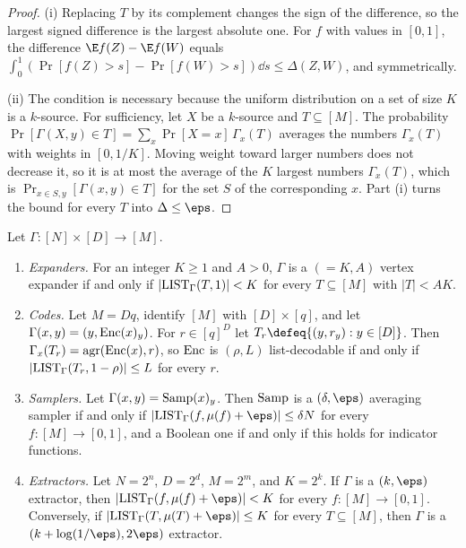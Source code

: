 \begin{refsection}
\begin{proof}
(i) Replacing $T$ by its complement changes the sign of the difference, so the largest signed difference is the largest absolute one. For $f$ with values in $[0,1]$, the difference $\E f(Z)-\E f(W)$ equals $\int_0^1(\Pr[f(Z)>s]-\Pr[f(W)>s])\dd s\le\Delta(Z,W)$, and symmetrically.

(ii) The condition is necessary because the uniform distribution on a set of size $K$ is a $k$-source. For sufficiency, let $X$ be a $k$-source and $T\subseteq[M]$. The probability $\Pr[\Gamma(X,y)\in T]=\sum_x\Pr[X=x]\,\Gamma_x(T)$ averages the numbers $\Gamma_x(T)$ with weights in $[0,1/K]$. Moving weight toward larger numbers does not decrease it, so it is at most the average of the $K$ largest numbers $\Gamma_x(T)$, which is $\Pr_{x\in S,y}[\Gamma(x,y)\in T]$ for the set $S$ of the corresponding $x$. Part (i) turns the bound for every $T$ into $\Delta\le\eps$.
\end{proof}

\begin{proposition}\label{prop:pseudorandom:dictionary}
Let $\Gamma\colon[N]\times[D]\to[M]$.
\begin{enumerate}
\item \emph{Expanders.} For an integer $K\ge1$ and $A>0$, $\Gamma$ is a $({=}K,A)$ vertex expander if and only if $|\mathrm{LIST}_\Gamma(T,1)|<K$ for every $T\subseteq[M]$ with $|T|<AK$.
\item \emph{Codes.} Let $M=Dq$, identify $[M]$ with $[D]\times[q]$, and let $\Gamma(x,y)=(y,\operatorname{Enc}(x)_y)$. For $r\in[q]^D$ let $T_r\defeq\{(y,r_y):y\in[D]\}$. Then $\Gamma_x(T_r)=\operatorname{agr}(\operatorname{Enc}(x),r)$, so $\operatorname{Enc}$ is $(\rho,L)$ list-decodable if and only if $|\mathrm{LIST}_\Gamma(T_r,1-\rho)|\le L$ for every $r$.
\item \emph{Samplers.} Let $\Gamma(x,y)=\operatorname{Samp}(x)_y$. Then $\operatorname{Samp}$ is a $(\delta,\eps)$ averaging sampler if and only if $|\pseudorandomList_\Gamma(f,\mu(f)+\eps)|\le\delta N$ for every $f\colon[M]\to[0,1]$, and a Boolean one if and only if this holds for indicator functions.
\item \emph{Extractors.} Let $N=2^n$, $D=2^d$, $M=2^m$, and $K=2^k$. If $\Gamma$ is a $(k,\eps)$ extractor, then $|\pseudorandomList_\Gamma(f,\mu(f)+\eps)|<K$ for every $f\colon[M]\to[0,1]$. Conversely, if $|\pseudorandomList_\Gamma(T,\mu(T)+\eps)|\le K$ for every $T\subseteq[M]$, then $\Gamma$ is a $(k+\log(1/\eps),2\eps)$ extractor.
\end{enumerate}
\end{proposition}


\end{refsection}
